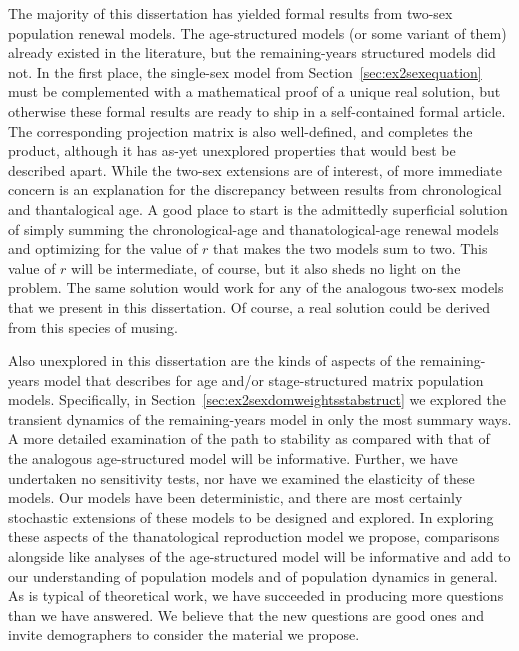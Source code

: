 The majority of this dissertation has yielded formal results from
two-sex population renewal models. The age-structured models (or some variant
of them) already existed in the literature, but the remaining-years structured
models did not. In the first place, the single-sex model from
Section~\ref{sec:ex2sexequation} must be complemented with a mathematical proof 
of a unique real solution, but otherwise these formal results are ready to ship
in a self-contained formal article. The corresponding projection matrix is also
well-defined, and completes the product, although it has as-yet 
unexplored properties that would best be described apart. While the two-sex
extensions are of interest, of more immediate concern is an explanation for
the discrepancy between results from chronological and thantalogical age. A good
place to start is the admittedly superficial solution of simply summing the
chronological-age and thanatological-age renewal models and optimizing for the
value of $r$ that makes the two models sum to two. This value of $r$ will be
intermediate, of course, but it also sheds no light on the problem. The same
solution would work for any of the analogous two-sex models that we
present in this dissertation. Of course, a real solution could be derived from
this species of musing.

Also unexplored in this dissertation are the kinds of aspects of the
remaining-years model that \citet{caswell2001matrix} describes for age and/or
stage-structured matrix population models. Specifically, in
Section~\ref{sec:ex2sexdomweightsstabstruct} we explored the transient 
dynamics of the remaining-years model in only the most summary ways. A more
detailed examination of the path to stability as compared with that of the analogous
age-structured model will be informative. Further, we have undertaken no
sensitivity tests, nor have we examined the elasticity of these models.
Our models have been deterministic, and there are most certainly
stochastic extensions of these models to be designed and explored. In exploring
these aspects of the thanatological reproduction model we propose,
comparisons alongside like analyses of the age-structured model will be
informative and add to our understanding of population models and of population
dynamics in general. As is typical of theoretical work, we
have succeeded in producing more questions than we have answered. We believe
that the new questions are good ones and invite demographers to consider the
material we propose.





